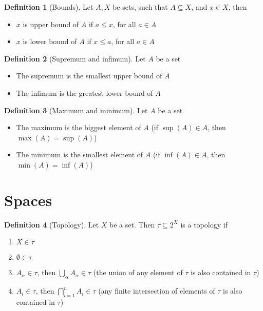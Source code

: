 \documentclass{article}
\newenvironment{enumrom}{\begin{enumerate}[label=(\roman*)]}{\end{enumerate}}
\theoremstyle{definition}
\newtheorem{definition}{Definition}[section]
\theoremstyle{definition}
\theoremstyle{plain}
\theoremstyle{plain}
\theoremstyle{plain}
\theoremstyle{plain}
\theoremstyle{definition}
\theoremstyle{remark}
\theoremstyle{remark}
\theoremstyle{remark}
\theoremstyle{remark}
\begin{document}
\begin{definition}[Bounds]
  Let $A, X$ be sets, such that $A \subseteq X$, and $x \in X$, then
  \begin{itemize}
  \item $x$ is upper bound of $A$ if $a \leq x$, for all $a \in A$
  \item $x$ is lower bound of $A$ if $x \leq a$, for all $a \in A$
  \end{itemize}
\end{definition}


\begin{definition}[Supremum and infimum]
  Let $A$ be a set
  \begin{itemize}
  \item The supremum is the smallest upper bound of $A$
  \item The infimum is the greatest lower bound of $A$
  \end{itemize}
\end{definition}


\begin{definition}[Maximum and minimum]
  Let $A$ be a set
  \begin{itemize}
  \item The maximum is the biggest element of $A$ (if $\sup(A) \in A$, then $\max(A) = \sup(A)$)
  \item The minimum is the smallest element of $A$ (if $\inf(A) \in A$, then $\min(A) = \inf(A)$)
  \end{itemize}
\end{definition}


\section{Spaces}


\begin{definition}[Topology]
  Let $X$ be a set. Then $\tau \subseteq 2^X$ is a topology if
  \begin{enumrom}
  \item $X \in \tau$
  \item $\emptyset \in \tau$
  \item $A_\alpha \in \tau$, then $\displaystyle \bigcup_\alpha A_\alpha \in \tau$ (the union of any element of $\tau$ is also contained in $\tau$)
  \item $A_i \in \tau$, then $\displaystyle \bigcap_{i = 1}^n A_i \in \tau$ (any finite intersection of elements of $\tau$ is also contained in $\tau$)
  \end{enumrom}
\end{definition}
\end{document}
